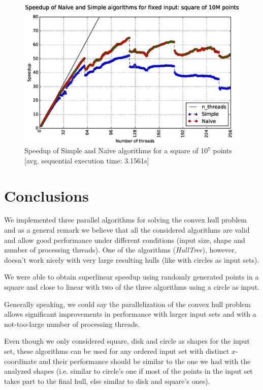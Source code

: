\documentclass[letterpaper]{article}
\theoremstyle{definition}
\begin{document}
\begin{figure}[!ht]\centering
  \includegraphics[scale=0.3]{./plots/total_speed.eps}
  \caption{Speedup of Simple and Naive algorithms for a square of 10$^7$ points [avg. sequential execution time: 3.1561s]\label{Speedup Total}}
\end{figure}

\section{Conclusions}

We implemented three parallel algorithms for solving the convex hull problem and as a general remark we believe that all the considered algorithms are valid and allow good performance under different conditions (input size, shape and number of processing threads).
One of the algorithms (\textit{HullTree}), however, doesn't work nicely with very large resulting hulls (like with circles as input sets).

We were able to obtain superlinear speedup using randomly generated points in a square and close to linear with two of the three algorithms using a circle as input.

Generally speaking, we could say the parallelization of the convex hull problem allows significant improvements in performance with larger input sets and with a not-too-large number of processing threads.

Even though we only considered square, disk and circle as shapes for the input set, these algorithms can be used for any ordered input set with distinct $x$-coordinate and their performance should be similar to the one we had with the analyzed shapes (i.e. similar to circle's one if most of the points in the input set takes part to the final hull, else similar to disk and square's ones).
\end{document}
